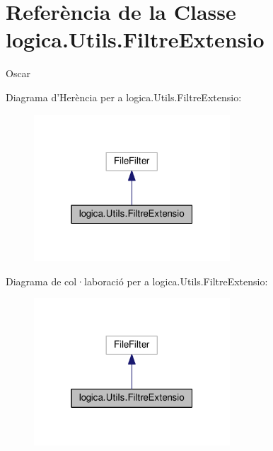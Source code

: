 \hypertarget{classlogica_1_1_utils_1_1_filtre_extensio}{\section{Referència de la Classe logica.\+Utils.\+Filtre\+Extensio}
\label{classlogica_1_1_utils_1_1_filtre_extensio}
}


Oscar  




Diagrama d'Herència per a logica.\+Utils.\+Filtre\+Extensio\+:
\nopagebreak
\begin{figure}[H]
\begin{center}
\leavevmode
\includegraphics[width=208pt]{classlogica_1_1_utils_1_1_filtre_extensio__inherit__graph}
\end{center}
\end{figure}


Diagrama de col·laboració per a logica.\+Utils.\+Filtre\+Extensio\+:
\nopagebreak
\begin{figure}[H]
\begin{center}
\leavevmode
\includegraphics[width=208pt]{classlogica_1_1_utils_1_1_filtre_extensio__coll__graph}
\end{center}
\end{figure}
